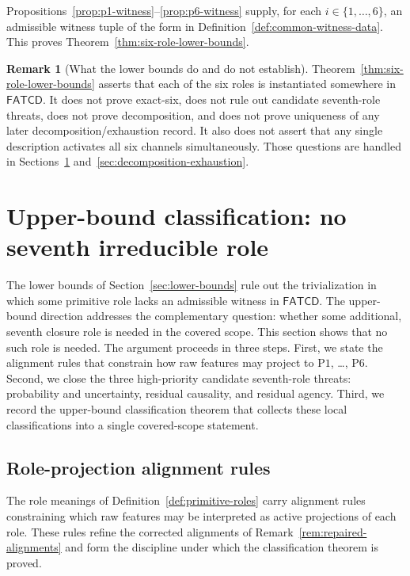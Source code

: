 \documentclass[11pt]{article}
\theoremstyle{definition}
\newtheorem{remark}[theorem]{Remark}
\newcommand{\FATCD}{\ensuremath{\mathsf{FATCD}}}
\newcommand{\Pone}{\ensuremath{\mathrm{P1}}}
\newcommand{\Psix}{\ensuremath{\mathrm{P6}}}
\begin{document}
Propositions~\ref{prop:p1-witness}--\ref{prop:p6-witness} supply, for
each \(i \in \{1,\ldots,6\}\), an admissible witness tuple of the
form in Definition~\ref{def:common-witness-data}. This proves
Theorem~\ref{thm:six-role-lower-bounds}.

\begin{remark}[What the lower bounds do and do not establish]\label{rem:lower-bounds-scope}
Theorem~\ref{thm:six-role-lower-bounds} asserts that each of the six
roles is instantiated somewhere in \FATCD{}. It does not prove
exact-six, does not rule out candidate seventh-role threats, does not
prove decomposition, and does not prove uniqueness of any later
decomposition/exhaustion record. It also does not assert that any
single description activates all six channels simultaneously. Those
questions are handled in
Sections~\ref{sec:upper-bound-classification}
and~\ref{sec:decomposition-exhaustion}.
\end{remark}
 \section{Upper-bound classification: no seventh irreducible role}\label{sec:upper-bound-classification}




The lower bounds of Section~\ref{sec:lower-bounds} rule out the
trivialization in which some primitive role lacks an admissible
witness in \FATCD{}. The upper-bound direction addresses the
complementary question: whether some additional, seventh closure role
is needed in the covered scope. This section shows that no such role
is needed. The argument proceeds in three steps. First, we state the
alignment rules that constrain how raw features may project to
\Pone{}, \ldots, \Psix{}. Second, we close the three high-priority
candidate seventh-role threats: probability and uncertainty, residual
causality, and residual agency. Third, we record the upper-bound
classification theorem that collects these local classifications into
a single covered-scope statement.

\subsection{Role-projection alignment rules}\label{subsec:alignment-rules}

The role meanings of Definition~\ref{def:primitive-roles} carry
alignment rules constraining which raw features may be interpreted as
active projections of each role. These rules refine the corrected
alignments of Remark~\ref{rem:repaired-alignments} and form the
discipline under which the classification theorem is proved.
\end{document}
